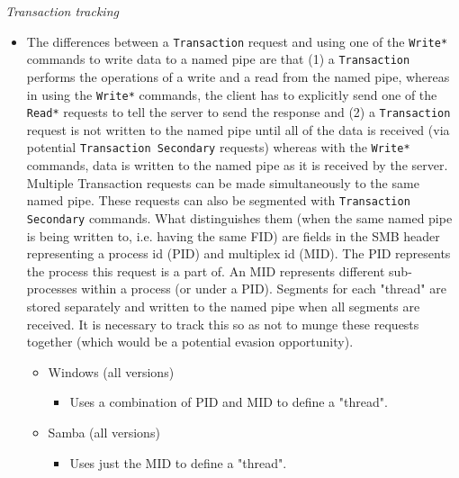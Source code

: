 \documentclass[english]{report}
\begin{document}
\textit{Transaction tracking}
\begin{itemize}

\item[] The differences between a \texttt{Transaction} request and using one of
the \texttt{Write*} commands to write data to a named pipe are that (1) a
\texttt{Transaction} performs the operations of a write and a read from the
named pipe, whereas in using the \texttt{Write*} commands, the client has to
explicitly send one of the \texttt{Read*} requests to tell the server to send
the response and (2) a \texttt{Transaction} request is not written to the named
pipe until all of the data is received (via potential \texttt{Transaction
Secondary} requests) whereas with the \texttt{Write*} commands, data is written
to the named pipe as it is received by the server. Multiple Transaction
requests can be made simultaneously to the same named pipe. These requests can
also be segmented with \texttt{Transaction Secondary} commands. What
distinguishes them (when the same named pipe is being written to, i.e. having
the same FID) are fields in the SMB header representing a process id (PID) and
multiplex id (MID).  The PID represents the process this request is a part of.
An MID represents different sub-processes within a process (or under a PID).
Segments for each "thread" are stored separately and written to the named pipe
when all segments are received. It is necessary to track this so as not to
munge these requests together (which would be a potential evasion opportunity).

\begin{itemize}
\item[] Windows (all versions)
\begin{itemize}
\item[] Uses a combination of PID and MID to define a "thread".
\end{itemize}
\item[] Samba (all versions)
\begin{itemize}
\item[] Uses just the MID to define a "thread".
\end{itemize}
\end{itemize}
\end{itemize}
\end{document}
